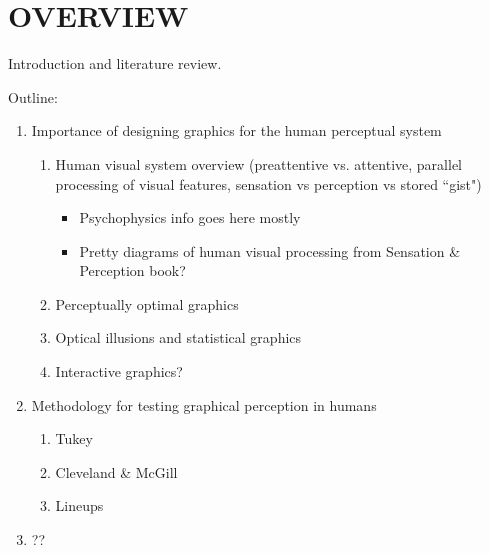 \documentclass[11pt]{isuthesis}\usepackage[]{graphicx}\usepackage[]{color}
\begin{document}

% 
\tableofcontents
{} \cleardoublepage {}
{}
\listoftables
\cleardoublepage {} {}
\listoffigures
% 
% 
\newpage
{}

\chapter{OVERVIEW}

Introduction and literature review.

Outline: 
\begin{enumerate}
\item Importance of designing graphics for the human perceptual system
\begin{enumerate}
  \item Human visual system overview (preattentive vs. attentive, parallel processing of visual features, sensation vs perception vs stored ``gist")
  \begin{itemize}
    \item Psychophysics info goes here mostly
    \item Pretty diagrams of human visual processing from Sensation \& Perception book?
  \end{itemize}
  \item Perceptually optimal graphics
  \item Optical illusions and statistical graphics
  \item Interactive graphics?
\end{enumerate}
\item Methodology for testing graphical perception in humans
\begin{enumerate}
  \item Tukey
  \item Cleveland & McGill
  \item Lineups
\end{enumerate}
\item ??
\end{enumerate}
\end{document}
